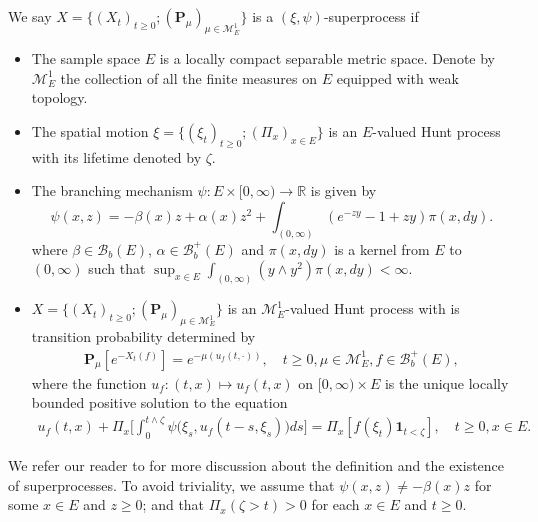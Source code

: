 \documentclass[12pt, a4paper]{amsart}
\theoremstyle{definition}
\numberwithin{equation}{section}
\begin{document}
\subsection{}
\label{sec: definition of superprocess}
	We say $X=\{(X_t)_{t\geq 0}; (\mathbf P_\mu)_{\mu \in \mathcal M^1_E}\}$ is a $(\xi,\psi)$-superprocess if
\begin{itemize}
\item
	The sample space $E$ is a locally compact separable metric space.
	Denote by $\mathcal M_E^1$ the collection of all the finite measures on $E$ equipped with weak topology.
\item
	The spatial motion $\xi=\{(\xi_t)_{t\geq 0};(\Pi_x)_{x\in E}\}$ is an $E$-valued Hunt process with its lifetime denoted by $\zeta$.
\item
    The branching mechanism $\psi: E\times[0,\infty) \to \mathbb R$ is given by
\begin{equation}
\label{eq: branching mechanism}
	\psi(x,z)=
	- \beta(x) z + \alpha (x) z^2 + \int_{(0,\infty)} (e^{-zy} - 1 + zy) \pi(x,dy).
\end{equation}
	where $\beta \in \mathscr B_b(E)$, $\alpha \in \mathscr B^+_b(E)$ and $\pi(x,dy)$ is a kernel from $E$ to $(0,\infty)$ such that $\sup_{x\in E} \int_{(0,\infty)} (y\wedge y^2) \pi(x,dy) < \infty$.
\item
	$X=\{(X_t)_{t\geq 0}; (\mathbf P_\mu)_{\mu \in \mathcal M^1_E}\}$ is an $\mathcal M^1_E$-valued Hunt process with is transition probability determined by
\begin{align}
	\mathbf P_\mu [e^{-X_t(f)}] = e^{-\mu(u_f(t,\cdot))},
	\quad t\geq 0, \mu \in \mathcal M_E^1, f\in \mathscr B^+_b(E),
\end{align}
	where the function $u_f:(t,x) \mapsto u_f(t,x)$ on $[0,\infty) \times E$ is the unique locally bounded positive solution to the equation
\begin{align}\label{eq:FKPP_in_definition}
	u_f(t,x) + \Pi_x \Big[  \int_0^{t\wedge \zeta} \psi \big(\xi_s,u_f(t-s,\xi_s)\big) ds \Big]
	= \Pi_x [ f(\xi_t)\mathbf 1_{t<\zeta} ],
	\quad t \geq 0, x \in E.
\end{align}
\end{itemize}
	We refer our reader to \cite{Li2011Measure-valued} for more discussion about the definition and the existence of superprocesses.
    To avoid triviality, we assume that $\psi(x,z)\neq -\beta(x)z$ for some $x \in E$ and $z \geq 0$; and that $\Pi_x(\zeta>t)>0$ for each $x \in E$ and $t \geq 0$.
\end{document}
